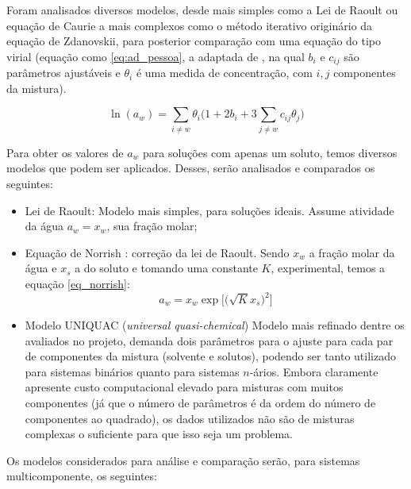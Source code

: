 \documentclass[
	12pt,				%
	openright,
	twoside,
	a4paper,			%
	brazil,			%
	french,				%
	spanish,			%
	english				%
	]{abntex2}
\begin{document}
Foram analisados diversos modelos, desde mais simples como a Lei de Raoult ou
equação de Caurie a mais complexos como o método iterativo originário da equação
de Zdanovskii, para posterior comparação com uma equação do tipo virial (equação
como \ref{eq:ad_pessoa}, a adaptada de \cite{pessoa2008}, na qual $b_i$ e
$c_{ij}$ são parâmetros ajustáveis e $\theta_i$ é uma medida de concentração,
com $i,j$ componentes da mistura).

\begin{equation}
	\label{eq:ad_pessoa}
	\ln(a_w) = \sum_{i \neq w}\theta_i\Bigg(1 +%
	2b_i+3\sum_{j \neq w}c_{ij}\theta_j\Bigg)
\end{equation}

Para obter os valores de $a_w$ para soluções com apenas um soluto, temos
diversos modelos que podem ser aplicados. Desses, serão analisados e comparados
os seguintes:

\begin{itemize}
	\item Lei de Raoult: Modelo mais simples, para soluções ideais. Assume
		atividade da água $a_w = x_w$, sua fração molar;
	\item Equação de Norrish \cite{norrish1966}: correção da lei de Raoult.
		Sendo $x_w$ a fração molar da água e $x_s$ a do soluto e
		tomando uma constante $K$, experimental, temos a equação
		\ref{eq_norrish}:
		\begin{equation}
			\label{eq_norrish}
			a_w = x_w\exp\Big[\Big(\sqrt{K}x_s\Big)^2\Big]
		\end{equation}
	\item Modelo UNIQUAC (\textit{universal quasi-chemical})
		\cite{abrams1975} Modelo mais refinado dentre os avaliados no
		projeto, demanda dois parâmetros para o ajuste para cada par de
		componentes da mistura (solvente e solutos), podendo ser tanto
		utilizado para sistemas binários quanto para sistemas $n$-ários.
		Embora claramente apresente custo computacional elevado para
		misturas com muitos componentes (já que o número de parâmetros
		é da ordem do número de componentes ao quadrado), os dados
		utilizados não são de misturas complexas o suficiente para que
		isso seja um problema.
\end{itemize}

Os modelos considerados para análise e comparação serão, para sistemas
multicomponente, os seguintes:
\end{document}
